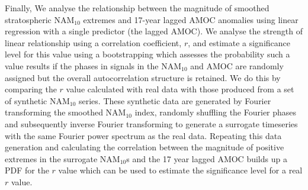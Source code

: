 Finally, We analyse the relationship between the magnitude of smoothed stratospheric NAM$_{10}$ extremes and 17-year lagged AMOC anomalies using linear regression with a single predictor (the lagged AMOC). We analyse the strength of linear relationship using a correlation coefficient, $r$, and estimate a significance level for this value using a bootstrapping which assesses the probability such a value results if the phases in signals in the NAM$_{10}$ and AMOC are randomly assigned but the overall autocorrelation structure is retained. We do this by comparing the $r$ value calculated with real data with those produced from a set of synthetic NAM$_{10}$ series. These synthetic data are generated by Fourier transforming the smoothed NAM$_{10}$ index, randomly shuffling the Fourier phases and subsequently inverse Fourier transforming to generate a surrogate timeseries with the same Fourier power spectrum as the real data. Repeating this data generation and calculating the correlation between the magnitude of positive extremes in the surrogate NAM$_{10}$s and the 17 year lagged AMOC builds up a PDF for the $r$ value which can be used to estimate the significance level for a real $r$ value.


